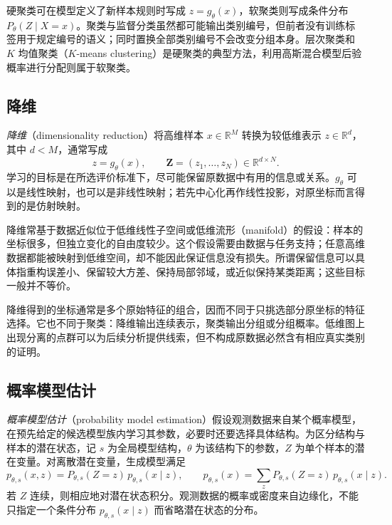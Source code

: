硬聚类可在模型定义了新样本规则时写成 $z=g_\theta(x)$，软聚类则写成条件分布 $P_\theta(Z\mid X=x)$。聚类与监督分类虽然都可能输出类别编号，但前者没有训练标签用于规定编号的语义；同时置换全部类别编号不会改变分组本身。层次聚类和 $K$ 均值聚类（$K$-means clustering）是硬聚类的典型方法，利用高斯混合模型后验概率进行分配则属于软聚类。

\subsection{降维}
\label{subsec:lh-unsup-dimension-reduction}

\begin{definition}[降维]
\label{def:lh-unsup-dimension-reduction}
\emph{降维}（dimensionality reduction）将高维样本 $x\in\mathbb R^M$ 转换为较低维表示 $z\in\mathbb R^d$，其中 $d<M$，通常写成
\begin{equation}
z=g_\theta(x),\qquad
\mathbf Z=(z_1,\ldots,z_N)\in\mathbb R^{d\times N}.
\label{eq:lh-unsup-representation}
\end{equation}
学习的目标是在所选评价标准下，尽可能保留原数据中有用的信息或关系。$g_\theta$ 可以是线性映射，也可以是非线性映射；若先中心化再作线性投影，对原坐标而言得到的是仿射映射。
\end{definition}

降维常基于数据近似位于低维线性子空间或低维流形（manifold）的假设：样本的坐标很多，但独立变化的自由度较少。这个假设需要由数据与任务支持；任意高维数据都能被映射到低维空间，却不能因此保证信息没有损失。所谓保留信息可以具体指重构误差小、保留较大方差、保持局部邻域，或近似保持某类距离；这些目标一般并不等价。

降维得到的坐标通常是多个原始特征的组合，因而不同于只挑选部分原坐标的特征选择。它也不同于聚类：降维输出连续表示，聚类输出分组或分组概率。低维图上出现分离的点群可以为后续分析提供线索，但不构成原数据必然含有相应真实类别的证明。

\subsection{概率模型估计}
\label{subsec:lh-unsup-probability-estimation}

\emph{概率模型估计}（probability model estimation）假设观测数据来自某个概率模型，在预先给定的候选模型族内学习其参数，必要时还要选择具体结构。为区分结构与样本的潜在状态，记 $s$ 为全局模型结构，$\theta$ 为该结构下的参数，$Z$ 为单个样本的潜在变量。对离散潜在变量，生成模型满足
\begin{equation}
p_{\theta,s}(x,z)=P_{\theta,s}(Z=z)\,p_{\theta,s}(x\mid z),\qquad
p_{\theta,s}(x)=\sum_zP_{\theta,s}(Z=z)\,p_{\theta,s}(x\mid z).
\label{eq:lh-unsup-latent-model}
\end{equation}
若 $Z$ 连续，则相应地对潜在状态积分。观测数据的概率或密度来自边缘化，不能只指定一个条件分布 $p_{\theta,s}(x\mid z)$ 而省略潜在状态的分布。

